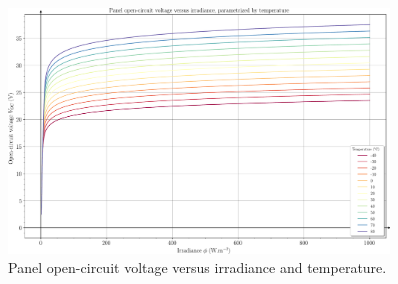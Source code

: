 \begin{figure}[h]
	\centering
	\includegraphics[angle = -90, width = 0.9\textwidth]{../images/pvPanelCurves/vocVersusIrradiance.pdf}
	\caption{Panel open-circuit voltage versus irradiance and temperature.}
	\label{fig:vocVersusIrradiance}
\end{figure}

	
